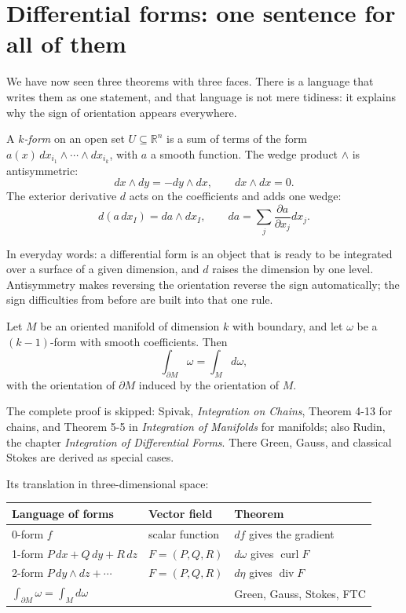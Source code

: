 \section{Differential forms: one sentence for all of them}

We have now seen three theorems with three faces. There is a language that
writes them as one statement, and that language is not mere tidiness: it
explains why the sign of orientation appears everywhere.

\begin{definisi}
 A \emph{$k$-form} on an open set
$U\subseteq\mathbb{R}^{n}$ is a sum of terms of the form
$a(x)\,dx_{i_{1}}\wedge\cdots\wedge dx_{i_{k}}$, with $a$ a smooth function.
The wedge product $\wedge$ is antisymmetric:
\[
dx\wedge dy=-dy\wedge dx,\qquad dx\wedge dx=0 .
\]
The exterior derivative $d$ acts on the coefficients and adds one wedge:
\[
d(a\,dx_{I})=da\wedge dx_{I},\qquad da=\sum_{j}\frac{\partial a}{\partial x_{j}}dx_{j}.
\]
\end{definisi}

In everyday words: a differential form is an object that is ready to be
integrated over a surface of a given dimension, and $d$ raises the dimension by one
level. Antisymmetry makes reversing the orientation reverse the sign automatically;
the sign difficulties from before are built into that one rule.

\begin{teorema}
Let $M$ be an oriented manifold of dimension $k$ with boundary, and let $\omega$
be a $(k-1)$-form with smooth coefficients. Then
\[
\int_{\partial M}\omega=\int_{M}d\omega ,
\]
with the orientation of $\partial M$ induced by the orientation of $M$.
\end{teorema}

The complete proof is skipped: Spivak, \emph{Integration on Chains}, Theorem 4-13
for chains, and Theorem 5-5 in \emph{Integration of Manifolds} for
manifolds; also Rudin, the chapter \emph{Integration of Differential Forms}. There
Green, Gauss, and classical Stokes are derived as special cases.

Its translation in three-dimensional space:

\begin{center}
\begin{tabular}{lll}
\hline
Language of forms & Vector field & Theorem \\
\hline
0-form $f$ & scalar function & $df$ gives the gradient \\
1-form $P\,dx+Q\,dy+R\,dz$ & $F=(P,Q,R)$ & $d\omega$ gives $\operatorname{curl}F$ \\
2-form $P\,dy\wedge dz+\cdots$ & $F=(P,Q,R)$ & $d\eta$ gives $\operatorname{div}F$ \\
$\int_{\partial M}\omega=\int_{M}d\omega$ & & Green, Gauss, Stokes, FTC \\
\hline
\end{tabular}
\end{center}

